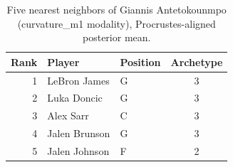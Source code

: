 \begin{table}[htbp]
  \centering\small
  \begin{tabular}{rllc}
    \toprule
    Rank & Player & Position & Archetype \\
    \midrule
    1 & LeBron James & G & 3 \\
    2 & Luka Doncic & G & 3 \\
    3 & Alex Sarr & C & 3 \\
    4 & Jalen Brunson & G & 3 \\
    5 & Jalen Johnson & F & 2 \\
    \bottomrule
  \end{tabular}
  \caption{Five nearest neighbors of Giannis Antetokounmpo (curvature_m1 modality), Procrustes-aligned posterior mean.}
  \label{tab:Giannis_Antetokounmpo_neighbors_curvature_m1}
\end{table}

